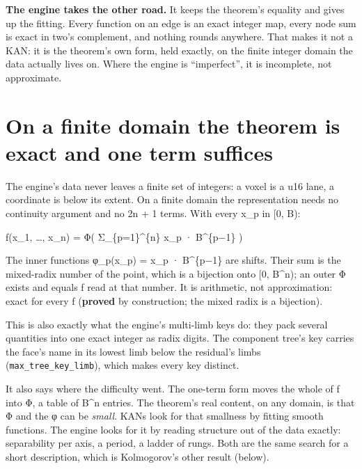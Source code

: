 \textbf{The engine takes the other road.} It keeps the theorem's equality and gives up the fitting. Every function on an edge is an exact integer map, every node sum is exact in two's complement, and nothing rounds anywhere. That makes it not a KAN: it is the theorem's own form, held exactly, on the finite integer domain the data actually lives on. Where the engine is “imperfect”, it is incomplete, not approximate.

\section{\texorpdfstring{On a finite domain the theorem is exact and one term suffices}{On a finite domain the theorem is exact and one term suffices}}

The engine's data never leaves a finite set of integers: a voxel is a u16 lane, a coordinate is below its extent. On a finite domain the representation needs no continuity argument and no 2n + 1 terms. With every x\_\allowbreak{}p in [0, B):

f(x\_\allowbreak{}1, …, x\_\allowbreak{}n) = Φ( Σ\_\allowbreak{}\{p=1\}\textasciicircum{}\{n\} x\_\allowbreak{}p · B\textasciicircum{}\{p−1\} )

The inner functions φ\_\allowbreak{}p(x\_\allowbreak{}p) = x\_\allowbreak{}p · B\textasciicircum{}\{p−1\} are shifts. Their sum is the mixed-radix number of the point, which is a bijection onto [0, B\textasciicircum{}n); an outer Φ exists and equals f read at that number. It is arithmetic, not approximation: exact for every f (\textbf{proved} by construction; the mixed radix is a bijection).

This is also exactly what the engine's multi-limb keys do: they pack several quantities into one exact integer as radix digits. The component tree's key carries the face's name in its lowest limb below the residual's limbs (\texttt{max\_\allowbreak{}tree\_\allowbreak{}key\_\allowbreak{}limb}), which makes every key distinct.

It also says where the difficulty went. The one-term form moves the whole of f into Φ, a table of B\textasciicircum{}n entries. The theorem's real content, on any domain, is that Φ and the φ can be \emph{small}. KANs look for that smallness by fitting smooth functions. The engine looks for it by reading structure out of the data exactly: separability per axis, a period, a ladder of rungs. Both are the same search for a short description, which is Kolmogorov's other result (below).

